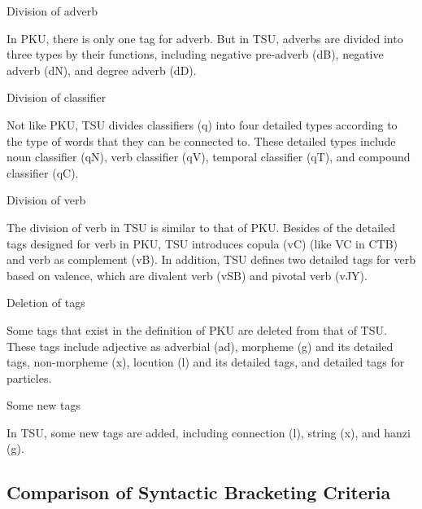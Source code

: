 \documentclass[english]{jnlp_1.4}
\renewcommand{\subsubsection}{}
\begin{document}
\setcounter{subsubsection}{0}
\subsubsection{Division of adverb}

In PKU, there is only one tag for adverb. But in TSU, adverbs are divided 
into three types by their functions, including negative pre-adverb (dB), 
negative adverb (dN), and degree adverb (dD).

\subsubsection{Division of classifier}

Not like PKU, TSU divides classifiers (q) into four detailed types according 
to the type of words that they can be connected to. These detailed types 
include noun classifier (qN), verb classifier (qV), temporal classifier 
(qT), and compound classifier (qC). 

\subsubsection{Division of verb}

The division of verb in TSU is similar to that of PKU. Besides of the 
detailed tags designed for verb in PKU, TSU introduces copula (vC) (like VC 
in CTB) and verb as complement (vB). In addition, TSU defines two detailed 
tags for verb based on valence, which are divalent verb (vSB) and pivotal 
verb (vJY).

\subsubsection{Deletion of tags}

Some tags that exist in the definition of PKU are deleted from that of TSU. 
These tags include adjective as adverbial (ad), morpheme (g) and its 
detailed tags, non-morpheme (x), locution (l) and its detailed tags, and 
detailed tags for particles.

\subsubsection{Some new tags}

In TSU, some new tags are added, including connection (l), string (x), and 
hanzi (g). 

\subsection{Comparison of Syntactic Bracketing Criteria}
\end{document}
